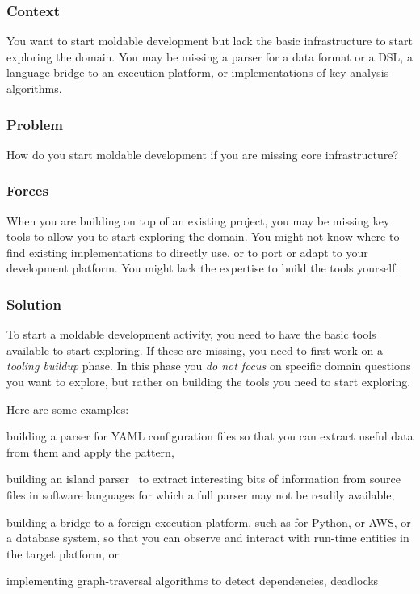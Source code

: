 \documentclass[sigconf]{acmart}
\newcommand{\pattern}[1]{\emph{\nameref{pat:#1}}\xspace}
\begin{document}
\subsubsection*{Context}
You want to start moldable development but lack the basic infrastructure to start exploring the domain.
You may be missing a parser for a data format or a DSL, a language bridge to an execution platform, or implementations of key analysis algorithms. 

\subsubsection*{Problem}
How do you start moldable development if you are missing core infrastructure?

\subsubsection*{Forces}
When you are building on top of an existing project, you may be missing key tools to allow you to start exploring the domain.
You might not know where to find existing implementations to directly use, or to port or adapt to your development platform.
You might lack the expertise to build the tools yourself.

\subsubsection*{Solution}
To start a moldable development activity, you need to have the basic tools available to start exploring.
If these are missing, you need to first work on a \emph{tooling buildup} phase.
In this phase you \emph{do not focus} on specific domain questions you want to explore, but rather on building the tools you need to start exploring.

Here are some examples:
\begin{inparaenum}[(i)]
\item building a parser for YAML configuration files so that you can extract useful data from them and apply the \pattern{moldableDataWrapper} pattern,
\item building an island parser~\cite{Kurs14b} to extract interesting bits of information from source files in software languages for which a full parser may not be readily available,
\item building a bridge to a foreign execution platform, such as for Python, or AWS, or a database system, so that you can observe and interact with run-time entities in the target platform, or
\item implementing graph-traversal algorithms to detect dependencies, deadlocks \etc
\end{inparaenum}
\end{document}
